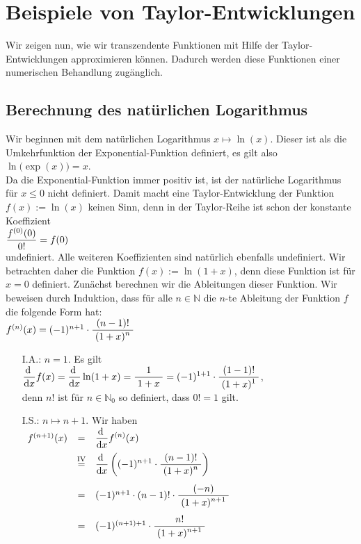 \section{Beispiele von Taylor-Entwicklungen}
Wir zeigen nun, wie wir transzendente Funktionen 
mit Hilfe der Taylor-Entwicklungen approximieren k\"onnen.  Dadurch werden diese Funktionen
einer numerischen Behandlung zug\"anglich.  

\subsection{Berechnung des nat\"urlichen Logarithmus}
Wir beginnen mit dem nat\"urlichen Logarithmus $x \mapsto \ln(x)$.  Dieser ist als die Umkehrfunktion der
Exponential-Funktion definiert, es gilt also
\\[0.2cm]
\hspace*{1.3cm}
$\ln\bigl(\exp(x)\bigr) = x$.
\\[0.2cm]
Da die Exponential-Funktion immer positiv ist, ist der nat\"urliche Logarithmus f\"ur $x \leq 0$  nicht
definiert.  Damit macht eine Taylor-Entwicklung der Funktion $f(x) := \ln(x)$ keinen Sinn, denn in
der Taylor-Reihe ist schon der konstante Koeffizient 
\\[0.2cm]
\hspace*{1.3cm}
$\displaystyle\frac{f^{(0)}(0)}{0!} = f(0)$
\\[0.2cm]
undefiniert.  Alle weiteren Koeffizienten sind nat\"urlich ebenfalls undefiniert.
Wir betrachten daher die Funktion $f(x)  := \ln(1 + x)$, denn diese Funktion ist f\"ur $x = 0$
definiert.  Zun\"achst berechnen wir die 
Ableitungen dieser Funktion.  Wir beweisen durch Induktion, dass f\"ur alle
$n \in \mathbb{N}$ die $n$-te Ableitung der Funktion $f$ die folgende Form hat:
\\[0.2cm]
\hspace*{1.3cm} $f^{(n)}(x) = (-1)^{n+1}\cdot \displaystyle\frac{\;\displaystyle(n-1)!\;}{\;\displaystyle(1+x)^n\;}$
\begin{enumerate}
\item[I.A.:] $n=1$.  Es gilt
  \\[0.2cm]
  \hspace*{1.3cm}
  $\displaystyle\frac{\textrm{d}\;}{\textrm{d}x} f(x) = \displaystyle\frac{\textrm{d}\;}{\textrm{d}x} \ln(1+x) = \displaystyle\frac{\;\displaystyle1\;}{\;\displaystyle1+x\;} = (-1)^{1+1}\cdot \displaystyle\frac{\;\displaystyle(1-1)!\;}{\;\displaystyle(1+x)^1\;}$,
  \\[0.2cm]
  denn $n!$ ist f\"ur $n\in\mathbb{N}_0$ so definiert, dass $0! = 1$ gilt.
\pagebreak
\item[I.S.:] $n \mapsto n+1$.  Wir haben 
  \\[0.3cm]
  \hspace*{1.3cm}
  $
  \begin{array}[t]{lcl}  
    f^{(n+1)}(x) & = & \displaystyle\frac{\textrm{d}\;}{\textrm{d}x} f^{(n)}(x) \\[0.3cm]
    & \stackrel{\mathrm{IV}}{=} & \displaystyle\frac{\textrm{d}\;}{\textrm{d}x} \left((-1)^{n+1}\cdot \displaystyle\frac{\;\displaystyle(n-1)!\;}{\;\displaystyle(1+x)^n\;}\right) \\[0.5cm]
    & = & (-1)^{n+1}\cdot (n-1)!\cdot \displaystyle\frac{\;\displaystyle(-n)\;}{\;\displaystyle(1+x)^{n+1}\;} \\[0.5cm]
    & = & (-1)^{(n+1)+1}\cdot \displaystyle\frac{\;\displaystyle n!\;}{\;\displaystyle(1+x)^{n+1}\;} \\[0.3cm]
  \end{array}
  $  
\end{enumerate}
